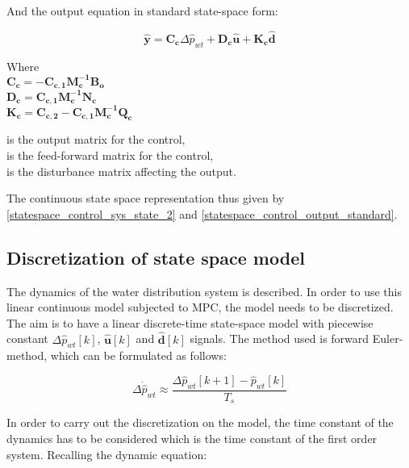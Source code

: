And the output equation in standard state-space form:

\begin{equation}
  \bm{\hat{y}} = \bm{C_c} \Delta \hat{p}_{wt} + \bm{D_c} \bm{\hat{u}} + \bm{K_c} \bm{\hat{d}}
\label{statespace_control_output_standard}
\end{equation}

\begin{minipage}[t]{0.40\textwidth}
Where\\
\hspace*{8mm} $\bm{C_c} = -\bm{C_{c,1}}\bm{M_c^{-1}}\bm{B_o} $ \\
\hspace*{8mm} $\bm{D_c} =  \bm{C_{c,1}}\bm{M_c^{-1}}\bm{N_c} $ \\
\hspace*{8mm} $\bm{K_c} = \bm{C_{c,2}} -\bm{C_{c,1}}\bm{M_c^{-1}}\bm{Q_c} $
\end{minipage}
\begin{minipage}[t]{0.48\textwidth}
\vspace*{1mm}
is the output matrix for the control, \\
is the feed-forward matrix for the control, \\
is the disturbance matrix affecting the output.
\end{minipage} 

The continuous state space representation thus given by \eqref{statespace_control_sys_state_2} and \eqref{statespace_control_output_standard}.

\subsection{Discretization of state space model}
 \label{discrete_SS}
 
The dynamics of the water distribution system is described. In order to use this linear continuous model subjected to MPC, the model needs to be discretized. The aim is to have a linear discrete-time state-space model with piecewise constant $\Delta \hat{p}_{wt}[k]$, $\bm{\hat{u}}[k]$ and $\bm{\hat{d}}[k]$ signals. The method used is forward Euler-method, which can be formulated as follows:

\begin{equation}
\Delta \dot{\hat{p}}_{wt} \approx  \frac{\Delta \hat{p}_{wt}[k+1] - \hat{p}_{wt}[k]}{T_s} 
 \label{statespace_discrete_state}
\end{equation}

In order to carry out the discretization on the model, the time constant of the dynamics has to be considered which is the time constant of the first order system. Recalling the dynamic equation:

